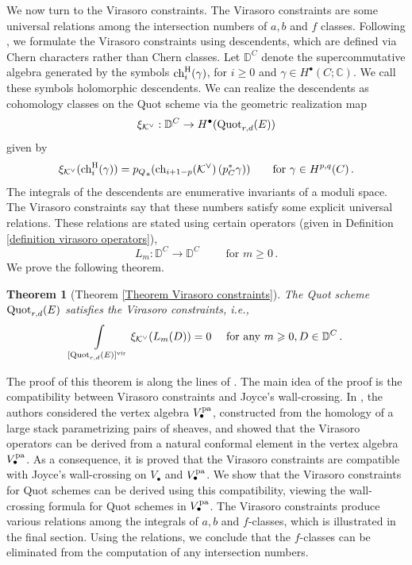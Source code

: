 \documentclass[11pt]{amsart}
\newtheorem*{theorem*}{Theorem}
\theoremstyle{remark}
\newcommand{\ch}{{\rm ch}}
\newcommand{\mb}[1]{\mathbb{#1}}
\newcommand{\D}{\mathbb{D}}
\newcommand{\K}{\mathcal{K}}
\newcommand{\quot}[0]{\textnormal{Quot}}
\newcommand{\vir}[0]{\textnormal{vir}}
\newcommand{\pa}[0]{\textnormal{pa}}
\newcommand{\chh}[0]{\textnormal{ch}^\textnormal{H}}
\numberwithin{theorem}{section}
\begin{document}
We now turn to the Virasoro constraints.
The Virasoro constraints are some universal relations among the intersection numbers of $a,b$ and $f$ classes.
Following \cite{BLM24}, we formulate the Virasoro constraints using descendents, which are defined via Chern characters rather than Chern classes.
Let $\D^C$ denote the supercommutative algebra generated 
by the symbols $\chh_i(\gamma)$, for $i \geqslant 0$ and $\gamma \in H^{\bullet}(C;\mb C)$.
We call these symbols holomorphic descendents.
We can realize the descendents as cohomology classes on the Quot scheme
via the geometric realization map 
$$ \xi_{\K^\vee}: \D^C \to H^{\bullet}(\quot_{r,d}(E))$$
given by
$$ \xi_{\K^\vee}(\chh_i(\gamma)) = {p_Q}_*(\ch_{i+1-p}(\K^\vee)\,(p_C^*\gamma)) \quad \quad \text{for } \gamma \in H^{p,q}(C)\,.$$
The integrals of the descendents are enumerative invariants of a moduli space. 
The Virasoro constraints say that these numbers satisfy some explicit universal relations.
These relations are stated using certain operators 
(given in Definition \ref{definition virasoro operators}),
$$L_m : \D^C \to \D^C 
\qquad \text{ for } m \geqslant 0\,.
$$
We prove the following theorem.
\begin{theorem*}[Theorem \ref{Theorem Virasoro constraints}]
    The Quot scheme $\quot_{r,d}(E)$ satisfies the Virasoro constraints, i.e.,
    $$\int\limits_{[\quot_{r,d}(E)]^\vir} \xi_{\K^\vee} (L_m(D)) = 0 \quad \text{ for any } m\geqslant 0, D \in \D^C\,.$$
    \end{theorem*}
The proof of this theorem is along the lines of \cite{BLM24}.
The main idea of the proof is the compatibility between 
Virasoro constraints and Joyce’s wall-crossing.
In \cite{BLM24}, the authors considered the vertex algebra $V^\pa_\bullet$,
constructed from the homology of a 
large stack parametrizing pairs of sheaves,
and showed that the Virasoro operators can be derived from a natural conformal element in the vertex algebra $V_\bullet^\pa$.
As a consequence, it is proved that the Virasoro constraints are compatible with Joyce's wall-crossing on $V_\bullet$ and $V^\pa_\bullet$.
We show that the Virasoro constraints for
Quot schemes can be derived using this compatibility,
viewing the wall-crossing formula for Quot schemes in $V^\pa_\bullet$.
The Virasoro constraints produce various relations among 
the integrals of $a,b$ and $f$-classes,  
which is illustrated in the final section.
Using the relations, we conclude that the $f$-classes can be eliminated from the computation of any intersection numbers.
\end{document}

